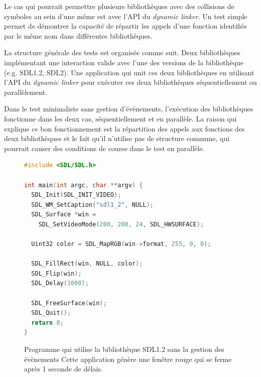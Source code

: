 Le cas qui pourrait permettre plusieurs bibliothèques avec des collisions de symboles
au sein d'une même est avec l'API du \textit{dynamic linker}. Un test simple permet
de démontrer la capacité de répartir les appels d'une fonction identifiés par le même nom
dans différentes bibliothèques.

La structure générale des tests est organisée comme suit. Deux bibliothèques implémentant
une interaction valide avec l'une des versions de la bibliothèque (e.g. SDL1.2, SDL2).
Une application qui unit ces deux bibliothèques en utilisant l'API du
\textit{dynamic linker} pour exécuter ces deux bibliothèques séquentiellement ou
parallèlement.


Dans le test minimaliste sans gestion d'évènements, l'exécution des bibliothèques
fonctionne dans les deux cas, séquentiellement et en parallèle. La raison qui
explique ce bon fonctionnement est la répartition des appels aux fonctions
des deux bibliothèques et le fait qu'il n'utilise pas de structure commune,
qui pourrait causer des conditions de course dans le test en parallèle.

\begin{center}
  \begin{figure}[ht]
\begin{lstlisting}[language=C,frame=single]
#include <SDL/SDL.h>

int main(int argc, char **argv) {
  SDL_Init(SDL_INIT_VIDEO);
  SDL_WM_SetCaption("sdl1_2", NULL);
  SDL_Surface *win =
    SDL_SetVideoMode(200, 200, 24, SDL_HWSURFACE);

  Uint32 color = SDL_MapRGB(win->format, 255, 0, 0);

  SDL_FillRect(win, NULL, color);
  SDL_Flip(win);
  SDL_Delay(1000);

  SDL_FreeSurface(win);
  SDL_Quit();
  return 0;
}
\end{lstlisting}
    \caption{Programme qui utilise la bibliothèque SDL1.2 sans la gestion des évènements
    Cette application génère une fenêtre rouge qui se ferme après 1 seconde de délais.}
  \end{figure}
\end{center}

